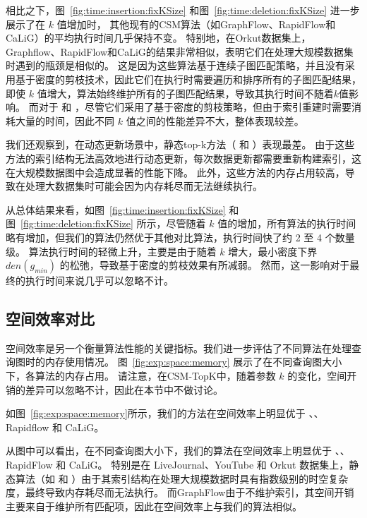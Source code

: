 相比之下，图~\ref{fig:time:insertion:fixKSize} 和图~\ref{fig:time:deletion:fixKSize} 进一步展示了在 $k$ 值增加时，
其他现有的CSM算法（如GraphFlow、RapidFlow和CaLiG）的平均执行时间几乎保持不变。
特别地，在Orkut数据集上，Graphflow、RapidFlow和CaLiG的结果非常相似，表明它们在处理大规模数据集时遇到的瓶颈是相似的。
这是因为这些算法基于连续子图匹配策略，并且没有采用基于密度的剪枝技术，因此它们在执行时需要遍历和排序所有的子图匹配结果，即使 $k$ 值增大，算法始终维护所有的子图匹配结果，导致其执行时间不随着$k$值影响。
而对于 \itk 和 \pm，尽管它们采用了基于密度的剪枝策略，但由于索引重建时需要消耗大量的时间，因此不同 $k$ 值之间的性能差异不大，整体表现较差。

我们还观察到，在动态更新场景中，静态top-k方法（ \itk 和 \pm）表现最差。
由于这些方法的索引结构无法高效地进行动态更新，每次数据更新都需要重新构建索引，这在大规模数据图中会造成显著的性能下降。
此外，这些方法的内存占用较高，导致在处理大数据集时可能会因为内存耗尽而无法继续执行。


从总体结果来看，如图~\ref{fig:time:insertion:fixKSize} 和图~\ref{fig:time:deletion:fixKSize} 所示，尽管随着 $k$ 值的增加，所有算法的执行时间略有增加，但我们的算法仍然优于其他对比算法，执行时间快了约 2 至 4 个数量级。
算法执行时间的轻微上升，主要是由于随着 $k$ 增大，最小密度下界 $den(g_{min})$ 的松弛，导致基于密度的剪枝效果有所减弱。
然而，这一影响对于最终的执行时间来说几乎可以忽略不计。


\subsection{空间效率对比}
\label{ch5:space}

空间效率是另一个衡量算法性能的关键指标。我们进一步评估了不同算法在处理查询图时的内存使用情况。
图~\ref{fig:exp:space:memory} 展示了在不同查询图大小下，各算法的内存占用。
请注意，在CSM-TopK中，随着参数 $k$ 的变化，空间开销的差异可以忽略不计，因此在本节中不做讨论。

如图~\ref{fig:exp:space:memory}所示，我们的方法在空间效率上明显优于 \itk、\pm、Rapidflow 和 CaLiG。

从图中可以看出，在不同查询图大小下，我们的算法在空间效率上明显优于 \itk、\pm、RapidFlow 和 CaLiG。
特别是在 LiveJournal、YouTube 和 Orkut 数据集上，静态算法（如 \itk 和 \pm）由于其索引结构在处理大规模数据时具有指数级别的时空复杂度，最终导致内存耗尽而无法执行。
而GraphFlow由于不维护索引，其空间开销主要来自于维护所有匹配项，因此在空间效率上与我们的算法相似。


